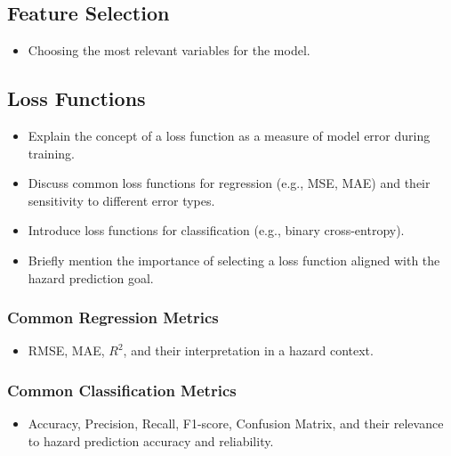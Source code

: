 \documentclass[
  letterpaper,
  DIV=11,
  numbers=noendperiod]{scrreprt}
\providecommand{\tightlist}{%
  \setlength{\itemsep}{0pt}\setlength{\parskip}{0pt}}
\begin{document}
\subsection{Feature Selection}\label{feature-selection}

\begin{itemize}
\tightlist
\item
  Choosing the most relevant variables for the model.
\end{itemize}

\subsection{Loss Functions}\label{loss-functions-1}

\begin{itemize}
\tightlist
\item
  Explain the concept of a loss function as a measure of model error
  during training.
\item
  Discuss common loss functions for regression (e.g., MSE, MAE) and
  their sensitivity to different error types.
\item
  Introduce loss functions for classification (e.g., binary
  cross-entropy).
\item
  Briefly mention the importance of selecting a loss function aligned
  with the hazard prediction goal.
\end{itemize}

\subsubsection{Common Regression
Metrics}\label{common-regression-metrics}

\begin{itemize}
\tightlist
\item
  RMSE, MAE, \(R^2\), and their interpretation in a hazard context.
\end{itemize}

\subsubsection{Common Classification
Metrics}\label{common-classification-metrics}

\begin{itemize}
\tightlist
\item
  Accuracy, Precision, Recall, F1-score, Confusion Matrix, and their
  relevance to hazard prediction accuracy and reliability.
\end{itemize}
\end{document}
